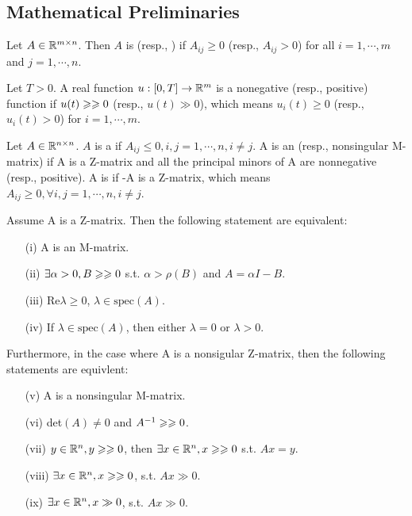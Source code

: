 \documentclass{paper}
\begin{document}
\subsection{Mathematical Preliminaries}
\begin{defi}
Let $A\in \mathbb{R}^{m\times n}$. Then $A$ is  (resp., ) if $A_{ij}\geqslant 0$ (resp.,
$A_{ij}>0$) for all $i=1,\cdots,m$ and $j=1,\cdots,n$.
\end{defi}
\begin{defi}
Let $T>0$. A real function ${u}:{[0,T]}\rightarrow{\mathbb{R}^{m}}$ is a nonegative (resp., positive) function if
$u(t)\geqslant\geqslant 0$ (resp., $u(t)\gg 0$), which means $u_i(t)\geqslant 0$ (resp., $u_i(t)>0$) for $i=1,\cdots,m$.
\end{defi}
\begin{defi}
Let $A\in \mathbb{R}^{n\times n}$. $A$ is a  if $A_{ij}\leqslant 0,i,j=1,\cdots,n,i\neq j$. A is an
 (resp., nonsingular M-matrix) if A is a Z-matrix and all the principal minors of A are
nonnegative (resp., positive). A is  if -A is a Z-matrix, which means
$A_{ij}\geqslant 0,\forall i,j=1,\cdots,n,i\neq j$.
\end{defi}
\begin{lem} \label{lem1}
Assume A is a Z-matrix. Then the following statement are equivalent:
\begin{enumerate}
\item[(i)]    A is an M-matrix.
\item[(ii)]   $\exists \alpha>0, B\geqslant\geqslant 0$ s.t. $\alpha > \rho(B)$ and $A=\alpha I-B$.
\item[(iii)]  Re$\lambda\geq 0$, $\lambda\in \mathrm{spec}(A)$.
\item[(iv)]   If $\lambda\in \mathrm{spec}(A)$, then either $\lambda=0$ or $\lambda>0$.
\end{enumerate}
Furthermore, in the case where A is a nonsigular Z-matrix, then the following statements are equivlent:
\begin{enumerate}
\item[(v)]    A is a nonsingular M-matrix.
\item[(vi)]   det$(A)\neq0$ and $A^{-1}\geqslant\geqslant 0$.
\item[(vii)]  $y\in\mathbb{R}^{n},y\geqslant\geqslant 0$, then $\exists x\in\mathbb{R}^{n},x\geqslant\geqslant 0$ s.t. $Ax=y$.
\item[(viii)] $\exists x\in\mathbb{R}^{n},x\geqslant\geqslant 0$, s.t. $Ax\gg 0$.
\item[(ix)]   $\exists x\in\mathbb{R}^{n},x\gg 0$, s.t. $Ax\gg 0$.
\end{enumerate}
\end{lem}
\end{document}
